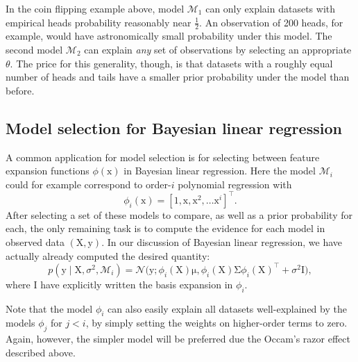 \documentclass{article}
\newcommand{\given}{\mid}
\newcommand{\mc}[1]{\mathcal{#1}}
\newcommand{\model}{\mc{M}}
\newcommand{\trans}{^\top}
\newcommand{\mat}[1]{\bm{\mathrm{#1}}}
\renewcommand{\vec}[1]{\bm{\mathrm{#1}}}
\begin{document}
In the coin flipping example above, model $\model_1$ can only explain
datasets with empirical heads probability reasonably near
$\frac{1}{2}$.  An observation of 200 heads, for example, would have
astronomically small probability under this model.  The second model
$\model_2$ can explain \emph{any} set of observations by selecting an
appropriate $\theta$.  The price for this generality, though, is that
datasets with a roughly equal number of heads and tails have a smaller
prior probability under the model than before.

\subsection*{Model selection for Bayesian linear regression}

A common application for model selection is for selecting between
feature expansion functions $\phi(\vec{x})$ in Bayesian linear
regression.  Here the model $\model_i$ could for example correspond
to order-$i$ polynomial regression with
\begin{equation*}
  \phi_i(\vec{x})
  =
  [1, \vec{x}, \vec{x}^2, \dotsc \vec{x}^i]\trans.
\end{equation*}
After selecting a set of these models to compare, as well as a prior
probability for each, the only remaining task is to compute the
evidence for each model in observed data $(\mat{X}, \vec{y})$.  In our
discussion of Bayesian linear regression, we have actually already
computed the desired quantity:
\begin{equation*}
  p(\vec{y} \given \mat{X}, \sigma^2, \model_i)
  =
  \mc{N}\bigl(\vec{y};
  \phi_i(\mat{X})\vec{\mu},
  \phi_i(\mat{X})\mat{\Sigma}\phi_i(\mat{X})\trans + \sigma^2\mat{I}\bigr),
\end{equation*}
where I have explicitly written the basis expansion in $\phi_i$.

Note that the model $\phi_i$ can also easily explain all datasets
well-explained by the models $\phi_j$ for $j < i$, by simply setting
the weights on higher-order terms to zero.  Again, however, the
simpler model will be preferred due the Occam's razor effect described
above.
\end{document}
